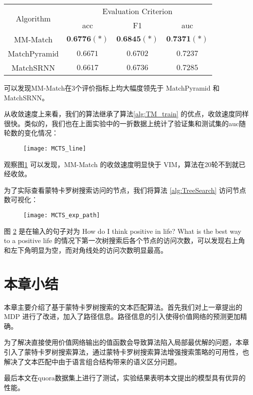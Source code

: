 \begin{table}[H]
    \label{tab:MCTS_small_test}
    \centering
    \footnotesize%
    \setlength{\tabcolsep}{4pt}%
    \renewcommand{\arraystretch}{1.2}%
    \begin{tabular}{cccc}
        \hline
        \multirow{2}{*}{Algorithm} &
        \multicolumn{3}{c}{\multirow{1}{*}{Evaluation Criterion}} \\
        \cline{2-4} & acc & F1 & auc \\
        \hline
        MM-Match & $\textbf{0.6776}(*)$ & $\textbf{0.6845}(*)$ & $\textbf{0.7371}(*)$ \\
        \hline
        MatchPyramid & $0.6671$ & $0.6702$ & $0.7237$ \\
        \hline
        MatchSRNN & $0.6617$ & $0.6736$ & $0.7285$\\
        \hline
    \end{tabular}
\end{table}

可以发现MM-Match在3个评价指标上均大幅度领先于 MatchPyramid 和 MatchSRNN。

从收敛速度上来看，我们的算法继承了算法\ref{alg:TM_train} 的优点，收敛速度同样很快。类似的，我们也在上面实验中的一折数据上统计了验证集和测试集的auc随轮数的变化情况：

\begin{figure}[H]
    \centering
    \texttt{[image: MCTS\_line]}
    \label{fig:MCTS_line}
\end{figure}

观察图\ref{fig:MCTS_line} 可以发现，MM-Match 的收敛速度明显快于 VIM，算法在20轮不到就已经收敛。

为了实际查看蒙特卡罗树搜索访问的节点，我们将算法 \ref{alg:TreeSearch} 访问节点数可视化：

\begin{figure}[H]
    \centering
    \texttt{[image: MCTS\_exp\_path]}
    \label{fig:MCTS_exp_path}
\end{figure}

图 \ref{fig:MCTS_exp_path} 是在输入的句子对为 How do I think positive in life? What is the best way to a positive life 的情况下第一次树搜索后各个节点的访问次数，可以发现右上角和左下角明显为空，而对角线处的访问次数明显最高。

\section{本章小结}
本章主要介绍了基于蒙特卡罗树搜索的文本匹配算法。首先我们对上一章提出的 MDP 进行了改进，加入了路径信息。路径信息的引入使得价值网络的预测更加精确。

为了解决直接使用价值网络输出的值函数会导致算法陷入局部最优解的问题，本章引入了蒙特卡罗树搜索算法，通过蒙特卡罗树搜索算法增强搜索策略的可用性，也解决了文本匹配中由于语言组合结构带来的语义区分问题。

最后本文在quora数据集上进行了测试，实验结果表明本文提出的模型具有优异的性能。
